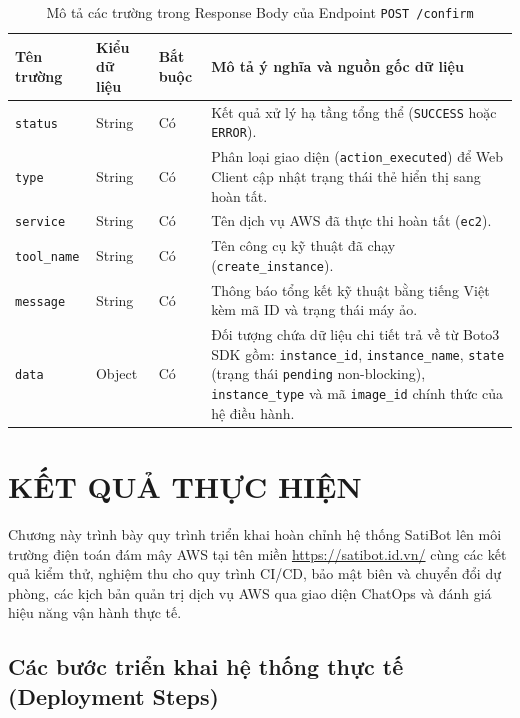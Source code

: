\documentclass[a4paper,12pt]{article}
\begin{document}
\begin{table}[H]
\centering
\caption{Mô tả các trường trong Response Body của Endpoint \texttt{POST /confirm}}
\label{tab:confirm_response}
\begingroup
\renewcommand{\arraystretch}{1.12}
\fontsize{10}{13}\selectfont
\begin{tabularx}{\linewidth}{@{}>{\raggedright\arraybackslash}p{3.2cm}>{\raggedright\arraybackslash}p{2.0cm}>{\centering\arraybackslash}p{1.8cm}Y@{}}
\toprule
\textbf{Tên trường} & \textbf{Kiểu dữ liệu} & \textbf{Bắt buộc} & \textbf{Mô tả ý nghĩa và nguồn gốc dữ liệu} \\
\midrule
\texttt{status} & String & Có & Kết quả xử lý hạ tầng tổng thể (\texttt{SUCCESS} hoặc \texttt{ERROR}). \\
\texttt{type} & String & Có & Phân loại giao diện (\texttt{action\_executed}) để Web Client cập nhật trạng thái thẻ hiển thị sang hoàn tất. \\
\texttt{service} & String & Có & Tên dịch vụ AWS đã thực thi hoàn tất (\texttt{ec2}). \\
\texttt{tool\_name} & String & Có & Tên công cụ kỹ thuật đã chạy (\texttt{create\_instance}). \\
\texttt{message} & String & Có & Thông báo tổng kết kỹ thuật bằng tiếng Việt kèm mã ID và trạng thái máy ảo. \\
\texttt{data} & Object & Có & Đối tượng chứa dữ liệu chi tiết trả về từ Boto3 SDK gồm: \texttt{instance\_id}, \texttt{instance\_name}, \texttt{state} (trạng thái \texttt{pending} non-blocking), \texttt{instance\_type} và mã \texttt{image\_id} chính thức của hệ điều hành. \\
\bottomrule
\end{tabularx}
\endgroup
\end{table}



\clearpage
\section{KẾT QUẢ THỰC HIỆN}

Chương này trình bày quy trình triển khai hoàn chỉnh hệ thống SatiBot lên môi trường điện toán đám mây AWS tại tên miền \url{https://satibot.id.vn/} cùng các kết quả kiểm thử, nghiệm thu cho quy trình CI/CD, bảo mật biên và chuyển đổi dự phòng, các kịch bản quản trị dịch vụ AWS qua giao diện ChatOps và đánh giá hiệu năng vận hành thực tế.

\subsection{Các bước triển khai hệ thống thực tế (Deployment Steps)}
\end{document}
